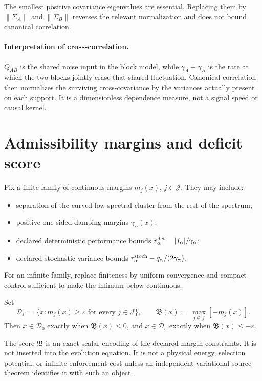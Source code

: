 \documentclass[11pt]{article}
\begin{document}
The smallest positive covariance eigenvalues are essential. Replacing them
by $\|\Sigma_A\|$ and $\|\Sigma_B\|$ reverses the relevant normalization and
does not bound canonical correlation.

\paragraph{Interpretation of cross-correlation.}
$Q_{AB}$ is the shared noise input in the block model, while
$\gamma_A+\gamma_B$ is the rate at which the two blocks jointly erase that
shared fluctuation.  Canonical correlation then normalizes the surviving
cross-covariance by the variances actually present on each support.  It is a
dimensionless dependence measure, not a signal speed or causal kernel.

\section{Admissibility margins and deficit score}

Fix a finite family of continuous margins $m_j(x)$, $j\in\mathcal J$. They may
include:
\begin{itemize}
\item separation of the curved low spectral cluster from the rest of the
spectrum;
\item positive one-sided damping margins $\gamma_\alpha(x)$;
\item declared deterministic performance bounds
$r^{\rm det}_\alpha-|f_\alpha|/\gamma_\alpha$;
\item declared stochastic variance bounds
$r^{\rm stoch}_\alpha-q_\alpha/(2\gamma_\alpha)$.
\end{itemize}
For an infinite family, replace finiteness by uniform convergence and compact
control sufficient to make the infimum below continuous.

\begin{definition}\label{def:deficit}
Set
\[
 \mathcal D_\varepsilon
 :=\{x:m_j(x)\ge\varepsilon\text{ for every }j\in\mathcal J\},
 \qquad
 \mathfrak B(x):=\max_{j\in\mathcal J}[-m_j(x)].
\]
Then $x\in\mathcal D_0$ exactly when $\mathfrak B(x)\le0$, and
$x\in\mathcal D_\varepsilon$ exactly when
$\mathfrak B(x)\le-\varepsilon$.
\end{definition}

\begin{proposition}\label{prop:diagnostic}
The score $\mathfrak B$ is an exact scalar encoding of the declared margin
constraints. It is not inserted into the evolution equation. It is not a
physical energy, selection potential, or infinite enforcement cost unless an
independent variational source theorem identifies it with such an object.
\end{proposition}
\end{document}
